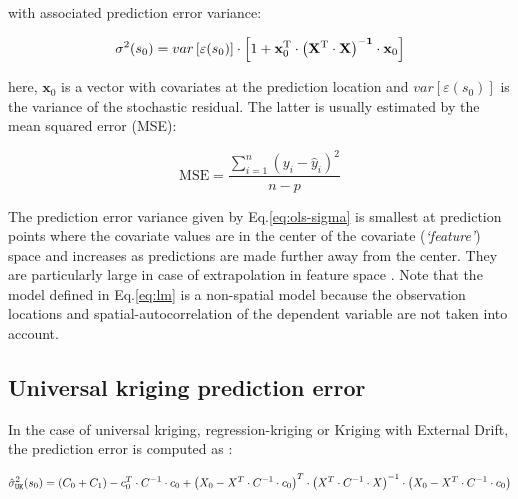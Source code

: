\documentclass[graybox,natbib,nospthms,UStrade]{svmono}
\begin{document}
with associated prediction error variance:

\begin{equation}
\sigma ^2 ({ s}_0 ) = var\left[ \varepsilon ({ s}_0) \right] \cdot \left[ {1 +
{\mathbf x}_0^{\rm T}  \cdot \left(
{{\mathbf X}^{\rm T}  \cdot {\mathbf X}} \right)^{ -
{\mathbf 1}}  \cdot {\mathbf x}_0 } \right]
\label{eq:ols-sigma}
\end{equation}

here, \({\mathbf x}_0\) is a vector with covariates at the prediction
location and \(var\left[ \varepsilon ({ s}_0) \right]\) is the variance
of the stochastic residual. The latter is usually estimated by the mean
squared error (MSE):

\begin{equation}
{\mathrm{MSE}} = \frac{\sum\limits_{i = 1}^n {(y_i - \hat y_i)^2}}{n-p}
\end{equation}

The prediction error variance given by Eq.\eqref{eq:ols-sigma} is
smallest at prediction points where the covariate values are in the
center of the covariate (\emph{`feature'}) space and increases as predictions
are made further away from the center. They are particularly large in
case of extrapolation in feature space \citep{Kutner2004McGraw}. Note that
the model defined in Eq.\eqref{eq:lm} is a non-spatial model because the
observation locations and spatial-autocorrelation of the dependent
variable are not taken into account.

\hypertarget{universal-kriging-prediction-error}{%
\subsection{Universal kriging prediction error}\label{universal-kriging-prediction-error}}

In the case of universal kriging, regression-kriging or Kriging with
External Drift, the prediction error is computed as
\citep{Christensen2001Springer}:

\begin{equation}
\hat \sigma _{\tt{UK}}^2 ({{s}}_0 )  = (C_0  + C_1 ) - {{c}}_{{0}}^{{T}}  \cdot {{C}}^{ - {{1}}}  \cdot
{{c}}_{{0}} + \left( {{{X}}_{{0}}  -
{{X}}^{{T}} \cdot {{C}}^{ - {{1}}} \cdot
{{c}}_{{0}} } \right)^{{T}}  \cdot \left( {{{X}}^{{T}}
\cdot {{C}}^{ - {{1}}} \cdot {{X}}} \right)^{{{ - 1}}} \cdot \left( {{{X}}_{{0}}  - {{X}}^{{T}}  \cdot
{{C}}^{ - {{1}}} \cdot {{c}}_{{0}} } \right)
\label{eq:UKvar}
\end{equation}
\end{document}
